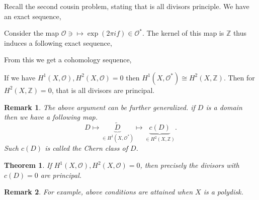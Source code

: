 \documentclass{article}
\newtheorem{theorem}{Theorem} [section]
\newtheorem{remark}{Remark}[section]
\newcommand{\Z}[0]{\mathbb{Z}}
\newcommand{\Ouv}[0]{\mathcal{O}}
\begin{document}
Recall the second cousin problem, stating that is all divisors principle. We have an exact sequence,
  \begin{center}
  \end{center}
  \begin{center}
  \end{center}
  Consider the map $\Ouv\ni \mapsto \exp(2\pi if)\in\Ouv^*$. The kernel of this map is $\Z$ thus induces a following exact sequence,
  \begin{center}
  \end{center}
  From this we get a cohomology sequence,
  \begin{center}
  \end{center}
  If we have $H^1(X,\Ouv),H^2(X,\Ouv)=0$ then $H^1(X,\Ouv^*)\cong H^2(X,\Z)$. Then for $H^2(X,\Z)=0$, that is all divisors are principal.
  \begin{remark}
  The above argument can be further generalized. if $D$ is a domain then we have a following map.
  \begin{equation*}
  D\mapsto \underbrace{\tilde{D}}_{\in H^1(X,\Ouv^*)}\mapsto \underbrace{c(D)}_{\in H^2(X,\Z)}.
  \end{equation*}
  Such $c(D)$ is called the Chern class of $D$.
\end{remark}
  \begin{theorem}
    If $H^1(X,\Ouv),H^2(X,\Ouv)=0$, then precisely the divisors with $c(D)=0$ are principal. 
  \end{theorem}

  \begin{remark}
    For example, above conditions are attained when $X$ is a polydisk.
  \end{remark}
\end{document}
